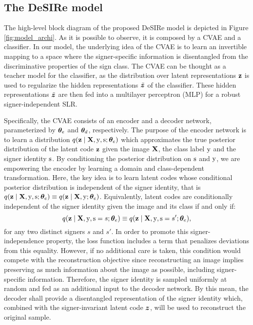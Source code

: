 \subsection{The DeSIRe model}

The high-level block diagram of the proposed DeSIRe model is depicted in Figure \ref{fig:model_archi}. As it is possible to observe, it is composed by a CVAE and a classifier. In our model, the underlying idea of the CVAE is to learn an invertible mapping to a space where the signer-specific information is disentangled from the discriminative properties of the sign class. The CVAE can be thought as a teacher model for the classifier, as the distribution over latent representations ${\mathbf{z}}$ is used to regularize the hidden representations $\tilde{{\bm{z}}}$ of the classifier. These hidden representations $\tilde{{\bm{z}}}$ are then fed into a multilayer perceptron (MLP) for a robust signer-independent SLR.

Specifically, the CVAE consists of an encoder and a decoder network, parameterized by ${\bm{\theta}}_e$ and ${\bm{\theta}}_d$, respectively. The purpose of the encoder network is to learn a distribution $q({\mathbf{z}} \mid {\mathbf{X}}, {\textnormal{y}}, {\textnormal{s}}; {\bm{\theta}}_e)$ which approximates the true posterior distribution of the latent code ${\mathbf{z}}$ given the image ${\mathbf{X}}$, the class label ${\textnormal{y}}$ and the signer identity ${\textnormal{s}}$. By conditioning the posterior distribution on ${\textnormal{s}}$ and ${\textnormal{y}}$, we are empowering the encoder by learning a domain and class-dependent transformation. Here, the key idea is to learn latent codes whose conditional posterior distribution is independent of the signer identity, that is $q({\mathbf{z}} \mid {\mathbf{X}}, {\textnormal{y}}, {\textnormal{s}}; {\bm{\theta}}_e) \equiv q({\mathbf{z}} \mid {\mathbf{X}}, {\textnormal{y}}; {\bm{\theta}}_e)$. Equivalently, latent codes are conditionally independent of the signer identity given the image and its class if and only if:
\begin{equation}
    \label{eq:independence}
    q({\mathbf{z}} \mid {\mathbf{X}}, {\textnormal{y}}, {\textnormal{s}}=s; {\bm{\theta}}_e) \equiv q({\mathbf{z}} \mid {\mathbf{X}}, {\textnormal{y}}, {\textnormal{s}}=s'; {\bm{\theta}}_e),
\end{equation}
for any two distinct signers $s$ and $s'$. In order to promote this signer-independence property, the loss function includes a term that penalizes deviations from this equality. However, if no additional care is taken, this condition would compete with the reconstruction objective since reconstructing an image implies preserving as much information about the image as possible, including signer-specific information. Therefore, the signer identity is sampled uniformly at random and fed as an additional input to the decoder network. By this mean, the decoder shall provide a disentangled representation of the signer identity which, combined with the signer-invariant latent code ${\bm{z}}$, will be used to reconstruct the original sample.

